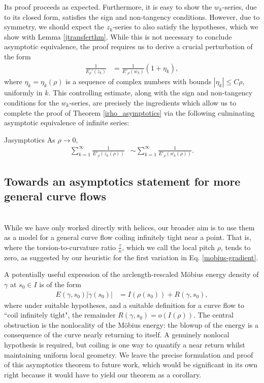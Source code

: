 \documentclass{amsart}
\theoremstyle{plain}
\numberwithin{theorem}{section}
\theoremstyle{definition}
\theoremstyle{remark}
\theoremstyle{brakets}
\begin{document}
Its proof proceeds as expected. Furthermore, it is easy to show the $w_k$-series, due to its closed form, satisfies the sign and non-tangency conditions. However, due to symmetry, we should expect the $z_k$-series to also satisfy the hypotheses, which we show with Lemma \ref{jtransferthm}. While this is not necessary to conclude asymptotic equivalence, the proof requires us to derive a crucial perturbation of the form
\begin{align*}
    \frac{1}{E_\rho'(z_k)} &= \frac{1}{E'_\rho(w_k)}(1+\eta_k),
\end{align*}
where $\eta_k = \eta_k(\rho)$ is a sequence of complex numbers with bounds $|\eta_k| \leq C\rho$, uniformly in $k$. This controlling estimate, along with the sign and non-tangency conditions for the $w_k$-series, are precisely the ingredients which allow us to complete the proof of Theorem \ref{irho_asymptotics} via the following culminating asymptotic equivalence of infinite series:
\begin{repprop}{Jasymptotics}
    As $\rho \to 0,$
    \begin{align*}
        \sum\limits_{k=1}^\infty \frac{1}{E'_\rho(z_k(\rho))} &\sim \sum\limits_{k=1}^\infty \frac{1}{E'_\rho(w_k(\rho))}.
    \end{align*}
\end{repprop}


\subsection{Towards an asymptotics statement for more general curve flows}
~\\
While we have only worked directly with helices, our broader aim is to use them as a model for a general curve flow coiling infinitely tight near a point. That is, where the torsion-to-curvature ratio $\frac{\tau}{\kappa}$, which we call the local pitch $\rho$, tends to zero, as suggested by our heuristic for the first variation in Eq. \eqref{mobius-gradient}.

A potentially useful expression of the arclength-rescaled M\"obius energy density of $\gamma$ at $s_0 \in I$ is of the form
\begin{align*}
    E(\gamma,s_0)|\dot{\gamma}(s_0)| &= I(\rho(s_0)) + R(\gamma,s_0),
\end{align*}
where under suitable hypotheses, and a suitable definition for a curve flow to ``coil infinitely tight", the remainder $R(\gamma,s_0) = o(I(\rho))$. The central obstruction is the nonlocality of the M\"obius energy: the blowup of the energy is a consequence of the curve nearly returning to itself. A genuinely nonlocal hypothesis is required, but coiling is one way to quantify a near return whilst maintaining uniform local geometry. We leave the precise formulation and proof of this asymptotics theorem to future work, which would be significant in its own right because it would have to yield our theorem as a corollary. 
\end{document}
